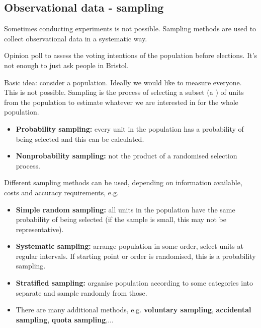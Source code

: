 \subsection{Observational data - sampling}

Sometimes conducting experiments is not possible. Sampling methods are used to collect observational data in a systematic way. 

\begin{example}
	Opinion poll to assess the voting intentions of the population before elections. It's not enough to just ask people in Bristol.
\end{example}

Basic idea: consider a population. Ideally we would like to measure everyone. This is not possible. Sampling is the process of selecting a subset (a ) of units from the population to estimate whatever we are interested in for the whole population.
\begin{itemize}
	\item \textbf{Probability sampling:} every unit in the population has a probability of being selected and this can be calculated.
	\item \textbf{Nonprobability sampling:} not the product of a randomised selection process.
\end{itemize}

Different sampling methods can be used, depending on information available, costs and accuracy requirements, e.g.
\begin{itemize}
	\item \textbf{Simple random sampling:} all units in the population have the same probability of being selected (if the sample is small, this may not be representative).
	\item \textbf{Systematic sampling:} arrange population in some order, select units at regular intervals. If starting point or order is randomised, this is a probability sampling.
	\item \textbf{Stratified sampling:} organise population according to some categories into separate  and sample randomly from those.
	\item There are many additional methods, e.g. \textbf{voluntary sampling}, \textbf{accidental sampling}, \textbf{quota sampling},...
\end{itemize}